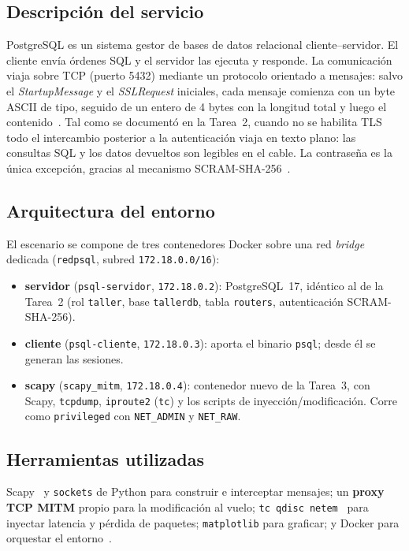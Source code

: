 \documentclass[11pt]{article}
\begin{document}
\subsection{Descripción del servicio}
PostgreSQL es un sistema gestor de bases de datos relacional cliente--servidor.
El cliente envía órdenes SQL y el servidor las ejecuta y responde. La
comunicación viaja sobre TCP (puerto 5432) mediante un protocolo orientado a
mensajes: salvo el \emph{StartupMessage} y el \emph{SSLRequest} iniciales, cada
mensaje comienza con un byte ASCII de tipo, seguido de un entero de 4 bytes con
la longitud total y luego el contenido~\cite{pgmessageformats}. Tal como se
documentó en la Tarea~2, cuando no se habilita TLS todo el intercambio
posterior a la autenticación viaja en texto plano: las consultas SQL y los datos
devueltos son legibles en el cable. La contraseña es la única excepción, gracias
al mecanismo SCRAM-SHA-256~\cite{rfc5802}.

\subsection{Arquitectura del entorno}
El escenario se compone de tres contenedores Docker sobre una red \emph{bridge}
dedicada (\texttt{redpsql}, subred \texttt{172.18.0.0/16}):

\begin{itemize}
  \item \textbf{servidor} (\texttt{psql-servidor}, \texttt{172.18.0.2}):
        PostgreSQL~17, idéntico al de la Tarea~2 (rol \texttt{taller}, base
        \texttt{tallerdb}, tabla \texttt{routers}, autenticación
        SCRAM-SHA-256).
  \item \textbf{cliente} (\texttt{psql-cliente}, \texttt{172.18.0.3}): aporta el
        binario \texttt{psql}; desde él se generan las sesiones.
  \item \textbf{scapy} (\texttt{scapy\_mitm}, \texttt{172.18.0.4}): contenedor
        nuevo de la Tarea~3, con Scapy, \texttt{tcpdump}, \texttt{iproute2}
        (\texttt{tc}) y los scripts de inyección/modificación. Corre como
        \texttt{privileged} con \texttt{NET\_ADMIN} y \texttt{NET\_RAW}.
\end{itemize}

\subsection{Herramientas utilizadas}
Scapy~\cite{scapy} y \texttt{sockets} de Python para construir e interceptar
mensajes; un \textbf{proxy TCP MITM} propio para la modificación al vuelo;
\texttt{tc qdisc netem}~\cite{netem} para inyectar latencia y pérdida de
paquetes; \texttt{matplotlib} para graficar; y Docker para orquestar el
entorno~\cite{dockernet}.
\end{document}
